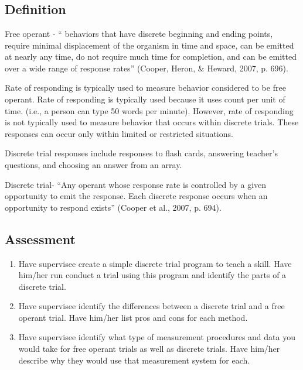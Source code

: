 \clearpage \section[\fourdEight{}]{\fourdEight{}%
              }
\subsection{Definition} 
Free operant - `` behaviors that have discrete beginning and ending points, require minimal displacement of the organism in time and space, can be emitted at nearly any time, do not require much time for completion, and can be emitted over a wide range of response rates'' (Cooper, Heron, \& Heward, 2007, p. 696).

Rate of responding is typically used to measure behavior considered to be free operant. Rate of responding is typically used because it uses count per unit of time. (i.e., a person can type 50 words per minute). However, rate of responding is not typically used to measure behavior that occurs within discrete trials. These responses can occur only within limited or restricted situations. 

Discrete trial responses include responses to flash cards, answering teacher's questions, and choosing an answer from an array. 

Discrete trial- ``Any operant whose response rate is controlled by a given opportunity to emit the response. Each discrete response occurs when an opportunity to respond exists'' (Cooper et al., 2007, p. 694).

\subsection{Assessment}
\begin{enumerate}
\item Have supervisee create a simple discrete trial program to teach a skill. Have him/her run conduct a trial using this program and identify the parts of a discrete trial.
\item Have supervisee identify the differences between a discrete trial and a free operant trial. Have him/her list pros and cons for each method.
\item Have supervisee identify what type of measurement procedures and data you would take for free operant trials as well as discrete trials. Have him/her describe why they would use that measurement system for each.
\end{enumerate}
%
